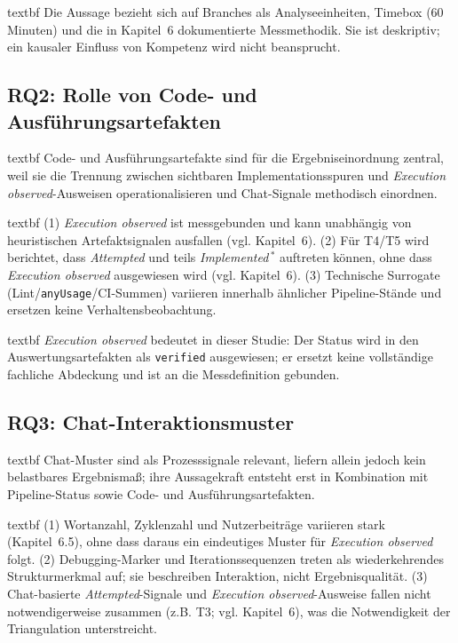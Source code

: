 	\csname textbf Die Aussage bezieht sich auf Branches als Analyseeinheiten, Timebox (60 Minuten) und die in Kapitel~6 dokumentierte Messmethodik. Sie ist deskriptiv; ein kausaler Einfluss von Kompetenz wird nicht beansprucht.

\subsection*{RQ2: Rolle von Code- und Ausf\"uhrungsartefakten}
	\csname textbf Code- und Ausf\"uhrungsartefakte sind f\"ur die Ergebniseinordnung zentral, weil sie die Trennung zwischen sichtbaren Implementationsspuren und \textit{Execution observed}-Ausweisen operationalisieren und Chat-Signale methodisch einordnen.

	\csname textbf (1) \textit{Execution observed} ist messgebunden und kann unabh\"angig von heuristischen Artefaktsignalen ausfallen (vgl. Kapitel~6). (2) F\"ur T4/T5 wird berichtet, dass \textit{Attempted} und teils \textit{Implemented}\,$^\ast$ auftreten k\"onnen, ohne dass \textit{Execution observed} ausgewiesen wird (vgl. Kapitel~6). (3) Technische Surrogate (Lint/\texttt{anyUsage}/CI-Summen) variieren innerhalb \"ahnlicher Pipeline-St\"ande und ersetzen keine Verhaltensbeobachtung.

	\csname textbf \textit{Execution observed} bedeutet in dieser Studie: Der Status wird in den Auswertungsartefakten als \texttt{verified} ausgewiesen; er ersetzt keine vollst\"andige fachliche Abdeckung und ist an die Messdefinition gebunden.

\subsection*{RQ3: Chat-Interaktionsmuster}
	\csname textbf Chat-Muster sind als Prozesssignale relevant, liefern allein jedoch kein belastbares Ergebnisma\ss ; ihre Aussagekraft entsteht erst in Kombination mit Pipeline-Status sowie Code- und Ausf\"uhrungsartefakten.

	\csname textbf (1) Wortanzahl, Zyklenzahl und Nutzerbeitr\"age variieren stark (Kapitel~6.5), ohne dass daraus ein eindeutiges Muster f\"ur \textit{Execution observed} folgt. (2) Debugging-Marker und Iterationssequenzen treten als wiederkehrendes Strukturmerkmal auf; sie beschreiben Interaktion, nicht Ergebnisqualit\"at. (3) Chat-basierte \textit{Attempted}-Signale und \textit{Execution observed}-Ausweise fallen nicht notwendigerweise zusammen (z.B. T3; vgl. Kapitel~6), was die Notwendigkeit der Triangulation unterstreicht.

